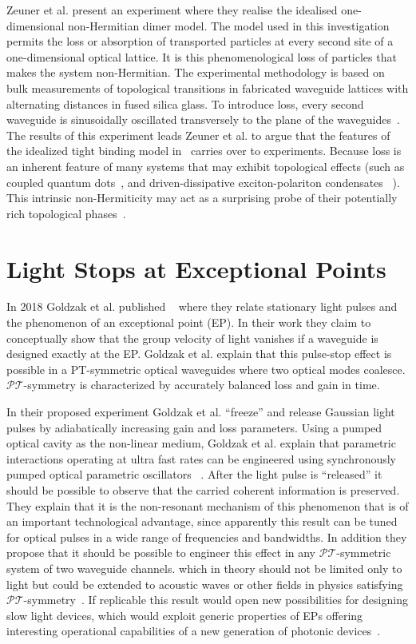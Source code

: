 \documentclass[12pt, a4paper]{report}
\newcommand\PT{\(\mathcal{PT}\)}
\begin{document}
Zeuner et al. present an experiment where they realise the idealised one-dimensional non-Hermitian dimer model. The model used in this investigation permits the loss or absorption of transported particles at every second site of a one-dimensional optical lattice. It is this phenomenological loss of particles that makes the system non-Hermitian. The experimental methodology is based on bulk measurements of topological transitions in fabricated waveguide lattices with alternating distances in fused silica glass.
To introduce loss, every second waveguide is sinusoidally oscillated transversely to the plane of the waveguides~\cite{TopoTrans}.
The results of this experiment leads Zeuner et al. to argue that the features of the idealized tight binding model in~\cite{Rudner} carries over to experiments. Because loss is an inherent feature of many systems that may exhibit topological effects (such as coupled quantum dots~\cite{Rudner}, and driven-dissipative exciton-polariton condensates ~\cite{Cones}). This intrinsic non-Hermiticity may act as a surprising probe of their potentially rich topological phases~\cite{TopoTrans}.

\section{Light Stops at Exceptional Points}\label{StopLight}
In 2018 Goldzak et al. published ~\cite{LightStopsatEPs} where they relate stationary light pulses and the phenomenon of an exceptional point (EP). In their work they claim to conceptually show that the group velocity of light vanishes if a waveguide is designed exactly at the EP. Goldzak et al. explain that this pulse-stop effect is possible in a PT-symmetric optical waveguides where two optical modes coalesce. \PT-symmetry is characterized by accurately balanced loss and gain in time. 

In their proposed experiment Goldzak et al. ``freeze'' and release Gaussian light pulses by adiabatically increasing gain and loss parameters. Using a pumped optical cavity as the non-linear medium, Goldzak et al. explain that parametric interactions operating at ultra fast rates can be engineered using synchronously pumped optical parametric oscillators ~\cite{LightStopsatEPs}. After the light pulse is ``released'' it should be possible to observe that the carried coherent information is preserved. They explain that it is the non-resonant mechanism of this phenomenon that is of an important technological advantage, since apparently this result can be tuned for optical pulses in a wide range of frequencies and bandwidths. In addition they propose that it should be possible to engineer this effect in any \PT-symmetric system of two waveguide channels. which in theory should not be limited only to light but could be extended to acoustic waves or other fields in physics satisfying \PT-symmetry~\cite{LightStopsatEPs}.
If replicable this result would open new possibilities for designing slow light devices, which would
exploit generic properties of EPs offering interesting operational capabilities of a new generation of photonic devices~\cite{LightStopsatEPs}.
\end{document}
